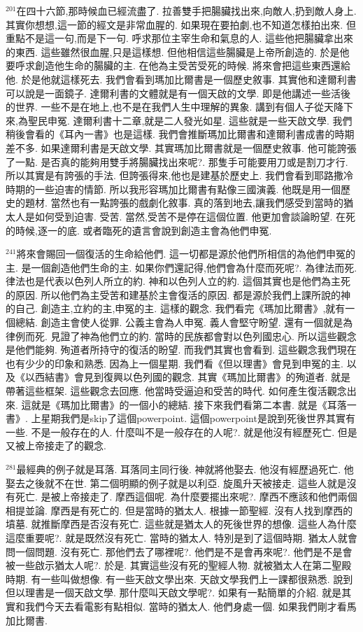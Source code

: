 \documentclass{book}
\begin{document}
$^{201}$在四十六節,那時候血已經流盡了.
拉善雙手把腸臟找出來,向敵人,扔到敵人身上.
其實你想想,這一節的經文是非常血腥的.
如果現在要拍劇,也不知道怎樣拍出來.
但重點不是這一句,而是下一句.
呼求那位主宰生命和氣息的人.
這些他把腸臟拿出來的東西.
這些雖然很血腥,只是這樣想.
但他相信這些腸臟是上帝所創造的.
於是他要呼求創造他生命的腸臟的主.
在他為主受苦受死的時候.
將來會把這些東西還給他.
於是他就這樣死去.
我們會看到瑪加比爾書是一個歷史敘事.
其實他和達爾利書可以說是一面鏡子.
達爾利書的文體就是有一個天啟的文學.
即是他講述一些活後的世界.
一些不是在地上,也不是在我們人生中理解的異象.
講到有個人子從天降下來,為聖民申冤.
達爾利書十二章,就是二人發光如星.
這些就是一些天啟文學.
我們稍後會看的《耳內一書》也是這樣.
我們會推斷瑪加比爾書和達爾利書成書的時期差不多.
如果達爾利書是天啟文學.
其實瑪加比爾書就是一個歷史敘事.
他可能誇張了一點.
是否真的能夠用雙手將腸臟找出來呢?.
那隻手可能要用刀或是割刀才行.
所以其實是有誇張的手法.
但誇張得來,他也是建基於歷史上.
我們會看到耶路撒冷時期的一些迫害的情節.
所以我形容瑪加比爾書有點像三國演義.
他既是用一個歷史的題材.
當然也有一點誇張的戲劇化敘事.
真的落到地去,讓我們感受到當時的猶太人是如何受到迫害.
受苦.
當然,受苦不是停在這個位置.
他更加會談論盼望.
在死的時候,逐一的底.
或者臨死的遺言會說到創造主會為他們申冤.

$^{241}$將來會賜回一個復活的生命給他們.
這一切都是源於他們所相信的為他們申冤的主.
是一個創造他們生命的主.
如果你們還記得,他們會為什麼而死呢?.
為律法而死.
律法也是代表以色列人所立的約.
神和以色列人立的約.
這個其實也是他們為主死的原因.
所以他們為主受苦和建基於主會復活的原因.
都是源於我們上課所說的神的自己.
創造主,立約的主,申冤的主.
這樣的觀念.
我們看完《瑪加比爾書》,就有一個總結.
創造主會使人從罪.
公義主會為人申冤.
義人會堅守盼望.
還有一個就是為律例而死.
見證了神為他們立的約.
當時的民族都會對以色列國忠心.
所以這些觀念是他們能夠.
殉道者所持守的復活的盼望.
而我們其實也會看到.
這些觀念我們現在也有少少的印象和熟悉.
因為上一個星期.
我們看《但以理書》會見到申冤的主.
以及《以西結書》會見到復興以色列國的觀念.
其實《瑪加比爾書》的殉道者.
就是帶著這些框架.
這些觀念去回應.
他當時受逼迫和受苦的時代.
如何產生復活觀念出來.
這就是《瑪加比爾書》的一個小的總結.
接下來我們看第二本書.
就是《耳落一書》.
上星期我們是skip了這個powerpoint.
這個powerpoint是說到死後世界其實有一些.
不是一般存在的人.
什麼叫不是一般存在的人呢?.
就是他沒有經歷死亡.
但是又被上帝接走了的觀念.

$^{281}$最經典的例子就是耳落.
耳落同主同行後.
神就將他娶去.
他沒有經歷過死亡.
他娶去之後就不在世.
第二個明顯的例子就是以利亞.
旋風升天被接走.
這些人就是沒有死亡.
是被上帝接走了.
摩西這個呢.
為什麼要擺出來呢?.
摩西不應該和他們兩個相提並論.
摩西是有死亡的.
但是當時的猶太人.
根據一節聖經.
沒有人找到摩西的墳墓.
就推斷摩西是否沒有死亡.
這些就是猶太人的死後世界的想像.
這些人為什麼這麼重要呢?.
就是既然沒有死亡.
當時的猶太人.
特別是到了這個時期.
猶太人就會問一個問題.
沒有死亡.
那他們去了哪裡呢?.
他們是不是會再來呢?.
他們是不是會被一些啟示猶太人呢?.
於是.
其實這些沒有死的聖經人物.
就被猶太人在第二聖殿時期.
有一些叫做想像.
有一些天啟文學出來.
天啟文學我們上一課都很熟悉.
說到但以理書是一個天啟文學.
那什麼叫天啟文學呢?.
如果有一點簡單的介紹.
就是其實和我們今天去看電影有點相似.
當時的猶太人.
他們身處一個.
如果我們剛才看馬加比爾書.
\end{document}
